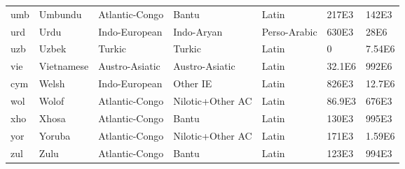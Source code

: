 \begin{tabular}{l l l l lll}
umb	& Umbundu	&	Atlantic-Congo	&	Bantu	&	Latin	&	217E3	&	142E3	\\
urd	& Urdu	&	Indo-European	&	Indo-Aryan	&	Perso-Arabic	&	630E3	&	28E6	\\
uzb	& Uzbek	&	Turkic	&	Turkic	&	Latin	&	0	&	7.54E6	\\
vie	& Vietnamese	&	Austro-Asiatic	&	Austro-Asiatic	&	Latin	&	32.1E6	&	992E6	\\
cym	& Welsh	&	Indo-European	&	Other IE	&	Latin	&	826E3	&	12.7E6	\\
wol	& Wolof	&	Atlantic-Congo	&	Nilotic+Other AC	&	Latin	&	86.9E3	&	676E3	\\
xho	& Xhosa	&	Atlantic-Congo	&	Bantu	&	Latin	&	130E3	&	995E3	\\
yor	& Yoruba	&	Atlantic-Congo	&	Nilotic+Other AC	&	Latin	&	171E3	&	1.59E6	\\
zul	& Zulu	&	Atlantic-Congo	&	Bantu	&	Latin	&	123E3	&	994E3
\end{tabular}
